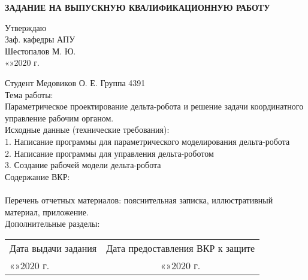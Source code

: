 
\newpage
\begin{center}
\large{\textbf{ЗАДАНИЕ НА ВЫПУСКНУЮ КВАЛИФИКАЦИОННУЮ РАБОТУ}}\\
\end{center}
\begin{flushright}
Утверждаю\\
Заф. кафедры АПУ\\
\underline{\hspace{3cm}} Шестопалов М. Ю.\\
«\underline{\hspace{0.7cm}}»\underline{\hspace{3cm}}2020 г.
\end{flushright}

\hfill \break
Студент Медовиков О. Е. \hspace{7cm} Группа 4391\\
Тема работы:\\ Параметрическое проектирование дельта-робота и решение задачи \hfill \break координатного управление рабочим органом.\\
Исходные данные (технические требования): \\
1. Написание программы для параметрического моделирования дельта-робота\\
2. Написание программы для управления дельта-роботом\\
3. Создание рабочей модели дельта-робота\\
Содержание ВКР:\\
\vspace{2cm} \\
Перечень отчетных материалов: пояснительная записка, иллюстративный\\ материал, приложение.\\
Дополнительные разделы:\\
\vspace{2cm}

\begin{tabular}{p{230pt}c}
Дата выдачи задания & Дата предоставления ВКР к защите\\
«\underline{\hspace{0.7cm}}»\underline{\hspace{3cm}}2020 г. &  «\underline{\hspace{0.7cm}}»\underline{\hspace{3cm}}2020 г.\\
\end{tabular}
\vspace{2cm}

